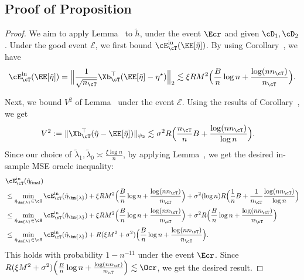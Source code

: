 \documentclass[12pt,a4paper,pdftex,onepage]{article}
\newcommand{\inn}{\operatorname{in}}
\newcommand{\sig}{\sigma}
\newcommand{\event}{\mathscr{E}}
\begin{document}
\subsection{Proof of Proposition~}

\begin{proof}
We aim to apply Lemma~ to $\tilde{h}$, under the event $\Ecr$ and given $\cD_1, \cD_2$.
Under the good event \(\event\), we first bound $ \cE_\cT^{\inn}(\EE[\tilde{\eta}])$.
By using Corollary~, we have
\begin{align*}
\cE_\cT^{\inn}(\EE[\tilde{\eta}])= \Bigl\|\frac{1}{\sqrt{n_{\cT}}}\Xb_\cT^\top (\EE[\tilde{\eta}] -\eta^\star)\Bigr\|_{2} \lesssim\xi RM^2  \Bigl(\frac{B}{n}\log n +\frac{\log (nn_\cT)}{n_{\cT}}\Bigr).
\end{align*}

Next, we bound \(V^2\) of Lemma~ under the event \(\event\).
Using the results of Corollary~, we get
\begin{align*}
V^2 := \|\Xb_\cT^\top (\tilde{\eta}- \EE[\tilde{\eta}]) \|_{\psi_2} &\lesssim 
\sig^2 R \Bigl(\frac{n_\cT}{n}B + \frac{\log (nn_\cT)}{\log n}\Bigr).
\end{align*}
Since our choice of \(\tilde{\lambda}_1, \tilde{\lambda}_0 \asymp \frac{\xi \log n}{n}\), by applying Lemma~, we get the desired in-sample MSE oracle inequality:
\begin{align*}
&\cE_{\cT}^{\inn}(\hat{\eta}_{\operatorname{final}}) \\
&\leq \min_{\hat{\eta}_{\bm{\lambda}} \in \cH} \cE_{\cT}^{\inn}(\hat{\eta}_{\bm{\lambda}})
+\xi RM^2  \Bigl(\frac{B}{n}\log n +\frac{\log (nn_\cT)}{n_{\cT}}\Bigr)
+ \sig^2 (\log n)  R  \Bigl(\frac{1}{n}B + \frac{1}{n_\cT}\frac{\log (nn_\cT)}{\log n} \Bigr)
\\
&\leq \min_{\hat{\eta}_{\bm{\lambda}} \in \cH} \cE_{\cT}^{\inn}(\hat{\eta}_{\bm{\lambda}})
+\xi RM^2  \Bigl(\frac{B}{n}\log n +\frac{\log (nn_\cT)}{n_{\cT}}\Bigr)
+ \sig^2  R  \Bigl(\frac{B}{n}\log n + \frac{\log (nn_\cT)}{n_\cT}  \Bigr)
\\
&\leq \min_{\hat{\eta}_{\bm{\lambda}} \in \cH} \cE_{\cT}^{\inn}(\hat{\eta}_{\bm{\lambda}})
+R(\xi M^2 + \sig^2 ) \Bigl(\frac{B}{n}\log n +\frac{\log (nn_\cT)}{n_{\cT}}\Bigr).
\end{align*} 
This holds with probability $1-n^{-11}$ under the event $\Ecr$.
Since $R(\xi M^2 + \sig^2 ) \Bigl(\frac{B}{n}\log n +\frac{\log (nn_\cT)}{n_{\cT}}\Bigr) \lesssim \Ocr$, we get the desired result.
\end{proof}
\end{document}
